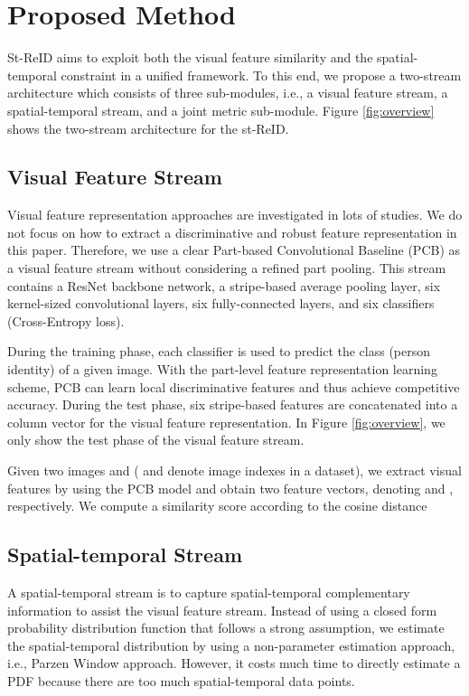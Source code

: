 \documentclass[letterpaper]{article} \usepackage{aaai19}  \usepackage{times}  \usepackage{helvet}  \usepackage{courier}  \usepackage{url}  \usepackage{graphicx}  \usepackage{subfig}
\begin{document}
\section{Proposed Method}
\label{sec:met}
St-ReID aims to exploit both the visual feature similarity and the spatial-temporal constraint in a unified framework. To this end, we propose a two-stream architecture which consists of three sub-modules, i.e., a visual feature stream, a spatial-temporal stream, and a joint metric sub-module. Figure \ref{fig:overview} shows the two-stream architecture for the st-ReID.

\subsection{Visual Feature Stream}
Visual feature representation approaches are investigated in lots of studies. We do not focus on how to extract a discriminative and robust feature representation in this paper. Therefore, we use a clear Part-based Convolutional Baseline (PCB) \cite{Yifan2017arxiv} as a visual feature stream without considering a refined part pooling. This stream contains a ResNet backbone network, a stripe-based average pooling layer, six  kernel-sized convolutional layers, six fully-connected layers, and six classifiers (Cross-Entropy loss).

During the training phase, each classifier is used to predict the class (person identity) of a given image. With the part-level feature representation learning scheme, PCB can learn local discriminative features and thus achieve competitive accuracy. During the test phase, six stripe-based features are concatenated into a column vector for the visual feature representation. In Figure \ref{fig:overview}, we only show the test phase of the visual feature stream.

Given two images  and  ( and  denote image indexes in a dataset), we extract visual features by using the PCB model and obtain two feature vectors, denoting  and , respectively. We compute a similarity score according to the cosine distance

\subsection{Spatial-temporal Stream}
A spatial-temporal stream is to capture spatial-temporal complementary information to assist the visual feature stream. Instead of using a closed form probability distribution function \cite{huang2016mmm} that follows a strong assumption, we estimate the spatial-temporal distribution by using a non-parameter estimation approach, i.e., Parzen Window approach. However, it costs much time to directly estimate a PDF because there are too much spatial-temporal data points.
\end{document}
